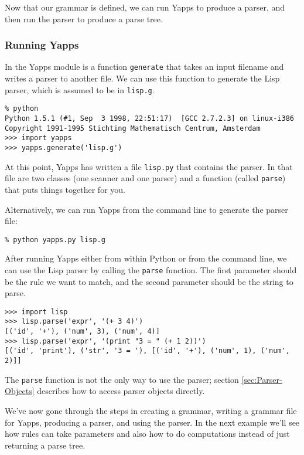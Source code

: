 \documentclass[10pt]{article}
\begin{document}
Now that our grammar is defined, we can run Yapps to produce a parser,
and then run the parser to produce a parse tree.

\subsubsection*{Running Yapps}

In the Yapps module is a function \texttt{generate} that takes an
input filename and writes a parser to another file.  We can use this
function to generate the Lisp parser, which is assumed to be in
\texttt{lisp.g}.

\begin{verbatim}
% python
Python 1.5.1 (#1, Sep  3 1998, 22:51:17)  [GCC 2.7.2.3] on linux-i386
Copyright 1991-1995 Stichting Mathematisch Centrum, Amsterdam
>>> import yapps
>>> yapps.generate('lisp.g')
\end{verbatim}

At this point, Yapps has written a file \texttt{lisp.py} that contains
the parser.  In that file are two classes (one scanner and one parser)
and a function (called \texttt{parse}) that puts things together for
you.

Alternatively, we can run Yapps from the command line to generate the
parser file:

\begin{verbatim}
% python yapps.py lisp.g
\end{verbatim}

After running Yapps either from within Python or from the command
line, we can use the Lisp parser by calling the \texttt{parse}
function.  The first parameter should be the rule we want to match,
and the second parameter should be the string to parse.

\begin{verbatim}
>>> import lisp
>>> lisp.parse('expr', '(+ 3 4)')
[('id', '+'), ('num', 3), ('num', 4)]
>>> lisp.parse('expr', '(print "3 = " (+ 1 2))')
[('id', 'print'), ('str', '3 = '), [('id', '+'), ('num', 1), ('num', 2)]]
\end{verbatim}

The \texttt{parse} function is not the only way to use the parser;
section \ref{sec:Parser-Objects} describes how to access parser objects
directly.

We've now gone through the steps in creating a grammar, writing a
grammar file for Yapps, producing a parser, and using the parser.  In
the next example we'll see how rules can take parameters and also how
to do computations instead of just returning a parse tree.
\end{document}
